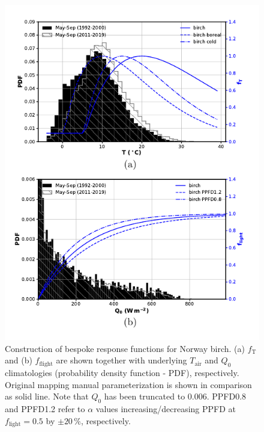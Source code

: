 \documentclass[bg, manuscript]{copernicus}
\begin{document}
\begin{figure}[t]
  \includegraphics[width=12cm]{figB3}
\caption{Construction of bespoke response functions for Norway birch. (a) $f_\mathrm{T}$ and (b) $f_\mathrm{flight}$ are shown together with underlying $T_\mathrm{air}$ and $Q_0$ climatologies (probability density function - PDF), respectively. Original mapping manual parameterization is shown in comparison as solid line. Note that $Q_0$ has been truncated to $0.006$. PPFD0.8 and PPFD1.2 refer to $\alpha$ values increasing/decreasing PPFD at $f_\mathrm{light}=0.5$ by $\pm 20\,\%$, respectively.}
\label{fig:f_temp_birch}
\end{figure}
\end{document}
